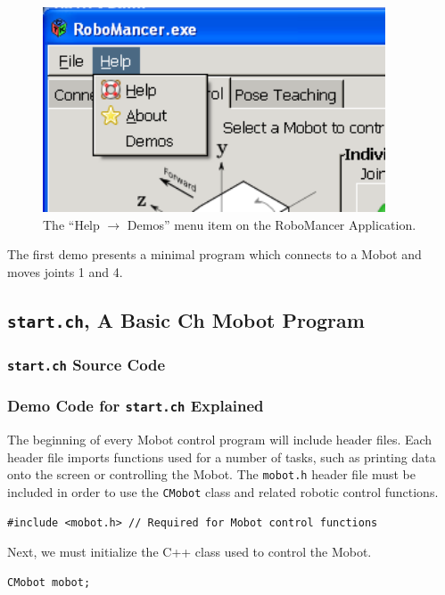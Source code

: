 \documentclass{article}
\begin{document}
\begin{figure}
  \centering
  \includegraphics[width=4in]{images/help_demos_screenshot.png}
  \caption{The ``Help $\rightarrow$ Demos'' menu item on the RoboMancer Application.}
  \label{fig:help_demos_screenshot}
\end{figure}


The first demo presents a minimal program which connects to a Mobot and
moves joints 1 and 4.

\subsection{\texttt{start.ch}, A Basic Ch Mobot Program}
\subsubsection{\texttt{start.ch} Source Code}


\subsubsection{\label{sec:democode}Demo Code for \texttt{start.ch} Explained}
The beginning of every Mobot control program will include header files. Each
header file imports functions used for a number of tasks, such as printing
data onto the screen or controlling the Mobot. The \texttt{mobot.h} header
file must be included in order to use the \texttt{CMobot} class and related
robotic control functions.

\begin{verbatim}
#include <mobot.h> // Required for Mobot control functions
\end{verbatim}

Next, we must initialize the C++ class used to control the Mobot. 

\begin{verbatim}
CMobot mobot;
\end{verbatim}
\end{document}
